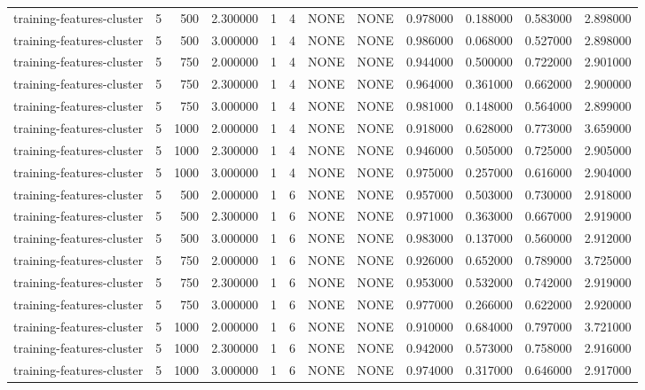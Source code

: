 \begin{tabular}{lrrrllllrrrr}
training-features-cluster & 5 & 500 & 2.300000 & 1 & 4 & NONE & NONE & 0.978000 & 0.188000 & 0.583000 & 2.898000 \\
training-features-cluster & 5 & 500 & 3.000000 & 1 & 4 & NONE & NONE & 0.986000 & 0.068000 & 0.527000 & 2.898000 \\
training-features-cluster & 5 & 750 & 2.000000 & 1 & 4 & NONE & NONE & 0.944000 & 0.500000 & 0.722000 & 2.901000 \\
training-features-cluster & 5 & 750 & 2.300000 & 1 & 4 & NONE & NONE & 0.964000 & 0.361000 & 0.662000 & 2.900000 \\
training-features-cluster & 5 & 750 & 3.000000 & 1 & 4 & NONE & NONE & 0.981000 & 0.148000 & 0.564000 & 2.899000 \\
training-features-cluster & 5 & 1000 & 2.000000 & 1 & 4 & NONE & NONE & 0.918000 & 0.628000 & 0.773000 & 3.659000 \\
training-features-cluster & 5 & 1000 & 2.300000 & 1 & 4 & NONE & NONE & 0.946000 & 0.505000 & 0.725000 & 2.905000 \\
training-features-cluster & 5 & 1000 & 3.000000 & 1 & 4 & NONE & NONE & 0.975000 & 0.257000 & 0.616000 & 2.904000 \\
training-features-cluster & 5 & 500 & 2.000000 & 1 & 6 & NONE & NONE & 0.957000 & 0.503000 & 0.730000 & 2.918000 \\
training-features-cluster & 5 & 500 & 2.300000 & 1 & 6 & NONE & NONE & 0.971000 & 0.363000 & 0.667000 & 2.919000 \\
training-features-cluster & 5 & 500 & 3.000000 & 1 & 6 & NONE & NONE & 0.983000 & 0.137000 & 0.560000 & 2.912000 \\
training-features-cluster & 5 & 750 & 2.000000 & 1 & 6 & NONE & NONE & 0.926000 & 0.652000 & 0.789000 & 3.725000 \\
training-features-cluster & 5 & 750 & 2.300000 & 1 & 6 & NONE & NONE & 0.953000 & 0.532000 & 0.742000 & 2.919000 \\
training-features-cluster & 5 & 750 & 3.000000 & 1 & 6 & NONE & NONE & 0.977000 & 0.266000 & 0.622000 & 2.920000 \\
training-features-cluster & 5 & 1000 & 2.000000 & 1 & 6 & NONE & NONE & 0.910000 & 0.684000 & 0.797000 & 3.721000 \\
training-features-cluster & 5 & 1000 & 2.300000 & 1 & 6 & NONE & NONE & 0.942000 & 0.573000 & 0.758000 & 2.916000 \\
training-features-cluster & 5 & 1000 & 3.000000 & 1 & 6 & NONE & NONE & 0.974000 & 0.317000 & 0.646000 & 2.917000 \\

\end{tabular}
